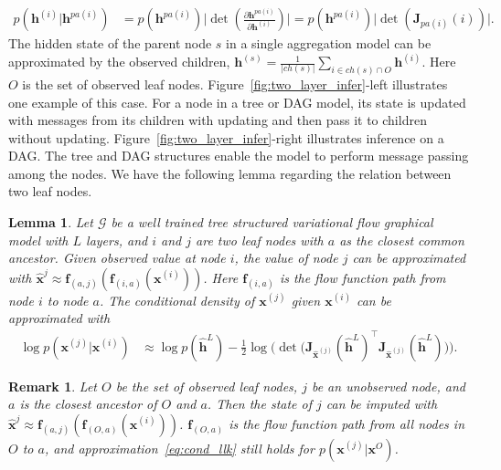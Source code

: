 \documentclass{article} %
\newtheorem{lemma}{Lemma}
\newtheorem{remark}{Remark}
\begin{document}
\begin{align*}
p(\mathbf{h}^{(i)} | \mathbf{h}^{pa(i)}) & = p(\mathbf{h}^{pa(i)}) \bigg|\det(\frac{\partial \mathbf{h}^{pa(i)} }{\partial \mathbf{h}^{(i)}})\bigg|  =
p(\mathbf{h}^{pa(i)}) \big|\det(\mathbf{J}_{pa(i)}(i))\big| .
\end{align*} 
The hidden state of the parent node $s$ in a single aggregation model can be approximated by the observed children,
$\mathbf{h}^{(s)}  = \frac{1}{|ch(s)|}\sum_{i \in ch(s) \cap O} \mathbf{h}^{(i)} .$
Here $O$ is the set of observed leaf nodes. Figure~\ref{fig:two_layer_infer}-left illustrates one example of this case. 
For a node in a tree or DAG model, its state is updated with messages from its children with updating and then pass it to  children without updating. Figure~\ref{fig:two_layer_infer}-right illustrates  inference on a DAG. The tree and DAG structures enable the model to perform message passing  among the nodes.  We have the following lemma regarding the relation between two leaf nodes. 
\begin{lemma}\label{lm:apprx}
Let $\mathcal{G}$ be a well trained tree structured variational flow graphical model with $L$ layers, and $i$ and $j$ are two leaf nodes with $a$ as the closest common ancestor. Given observed value at node $i$, the value of node $j$ can be approximated with   $\widehat{\mathbf{x}}^{j} \approx  \mathbf{f}_{(a,j)}(\mathbf{f}_{(i, a)}(\mathbf{x}^{(i)}))$. Here $\mathbf{f}_{(i, a)}$ is the flow function path from node $i$ to node $a$. The conditional density of $\mathbf{x}^{(j)}$ given $\mathbf{x}^{(i)}$ can be approximated with 
\begin{align} \label{eq:cond_llk}
\log p(\mathbf{x}^{(j)} | \mathbf{x}^{(i)}) &\approx  \log p(\widehat{\mathbf{h}}^L) -  \frac{1}{2} \log \big(\det \big(\mathbf{J}_{\widehat{\mathbf{x}}^{(j)}}(\widehat{\mathbf{h}}^L)^\top\mathbf{J}_{\widehat{\mathbf{x}}^{(j)}}(\widehat{\mathbf{h}}^L)\big) \big).
\end{align}
\end{lemma}

\begin{remark}\label{rmk:apprx_mul}
Let $O$ be the set of observed leaf nodes, $j$ be an unobserved node, and $a$ is the closest ancestor of $O$ and $a$. Then the state of $j$ can be imputed with  $\widehat{\mathbf{x}}^{j} \approx  \mathbf{f}_{(a,j)}(\mathbf{f}_{(O, a)}(\mathbf{x}^{(i)}))$.  $\mathbf{f}_{(O, a)}$ is the flow function path from all nodes in $O$ to $a$, and approximation~\eqref{eq:cond_llk} still holds for $p(\mathbf{x}^{(j)} | \mathbf{x}^{O})$.
\end{remark}
\end{document}
